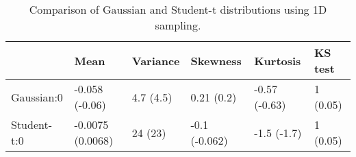\begin{table}
\caption{Comparison of Gaussian and Student-t distributions using 1D sampling.}
\label{tab:ch5_6_a}
\begin{tabular}{llllll}
\toprule
 & Mean & Variance & Skewness & Kurtosis & KS test \\
\midrule
Gaussian:0 & -0.058 (-0.06) & 4.7 (4.5) & 0.21 (0.2) & -0.57 (-0.63) & 1 (0.05) \\
Student-t:0 & -0.0075 (0.0068) & 24 (23) & -0.1 (-0.062) & -1.5 (-1.7) & 1 (0.05) \\
\bottomrule
\end{tabular}
\end{table}
